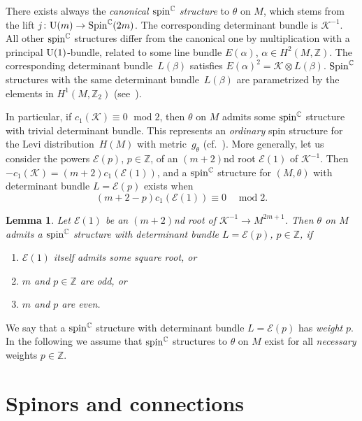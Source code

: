 \documentclass[pdftex]{sigma}
\numberwithin{equation}{section}
\newtheorem{Lemma}[Theorem]{Lemma}
\newcommand{\ZZ}{\mathbb{Z}}
\newcommand{\CC}{\mathbb{C}}
\begin{document}
There exists always the {\em canonical ${\rm spin}^\CC$ structure} to $\theta$ on $M$, which stems from the lift $j\colon {\rm U}(m)\to {\rm Spin}^{\CC}(2m)$.
The corresponding determinant bundle is $\mathcal{K}^{-1}$. All other ${\rm spin}^\CC$ structures differ from the canonical one by multiplication
with a principal ${\rm U}(1)$-bundle, related to some line bundle $E(\alpha)$, $\alpha\in H^2(M,\ZZ)$.
The corresponding determinant bundle~$L(\beta)$ satisfies $E(\alpha)^2=\mathcal{K}\otimes L(\beta)$.
${\rm Spin}^\CC$ structures with the same determinant bundle~$L(\beta)$ are parametrized by the
elements in $H^1(M,\ZZ_2)$ (see~\cite{LMS,Pet}).

In particular, if $c_1(\mathcal{K})\equiv 0$ $\operatorname{mod} 2$, then $\theta$ on $M$ admits some ${\rm spin}^\CC$ structure with trivial determinant bundle.
This represents an {\em ordinary} spin structure for the Levi distribution~$H(M)$ with metric~$g_\theta$ (cf.~\cite{LeiN1}).
More generally, let us consider the powers $\mathcal{E}(p)$, $p\in\ZZ$, of an $(m+2)$nd root $\mathcal{E}(1)$ of $\mathcal{K}^{-1}$.
Then $-c_1(\mathcal{K})=(m+2)c_1(\mathcal{E}(1))$, and a ${\rm spin}^\CC$ structure for $(M,\theta)$ with determinant bundle $L=\mathcal{E}(p)$ exists when
\begin{equation*}\label{condi1} (m+2-p)c_1(\mathcal{E}(1)) \equiv 0\quad \operatorname{mod} 2.\end{equation*}

\begin{Lemma} Let $\mathcal{E}(1)$ be an $(m+2)$nd root of $\mathcal{K}^{-1}\to M^{2m+1}$. Then $\theta$ on $M$ admits a ${\rm spin}^\CC$ structure
with determinant bundle $L=\mathcal{E}(p)$, $p\in\ZZ$, if
\begin{enumerate}\itemsep=0pt
\item[$(i)$] $\mathcal{E}(1)$ itself admits some square root, or
\item[$(ii)$] $m$ and $p\in\ZZ$ are odd, or
\item[$(iii)$] $m$ and $p$ are even.
\end{enumerate}
\end{Lemma}

We say that a ${\rm spin}^\CC$ structure with determinant bundle $L=\mathcal{E}(p)$ has {\em weight} $p$.
In the following we assume that ${\rm spin}^\CC$ structures to $\theta$ on $M$ exist for all {\em necessary} weights $p\in\ZZ$.

\section{Spinors and connections} \label{Sec5}
\end{document}

